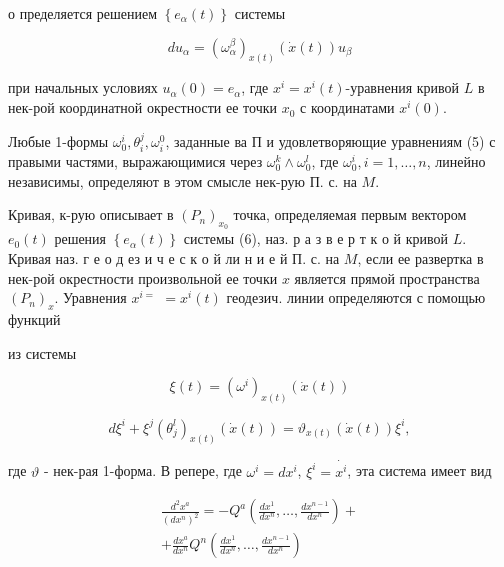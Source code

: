 \documentclass[10pt]{article}
\begin{document}
о пределяется решением $\left\{e_{\alpha}(t)\right\}$ системы



\[

d u_{\alpha}=\left(\omega_{\alpha}^{\beta}\right)_{x(t)}(\dot{x}(t)) u_{\beta}

\]



при начальных условиях $u_{\alpha}(0)=e_{\alpha}$, где $x^{i}=x^{i}(t)$-уравнения кривой $L$ в нек-рой координатной окрестности ее точки $x_{0}$ с координатами $x^{i}(0)$.



Любые 1-формы $\omega_{0}^{i}, \theta_{i}^{j}, \omega_{i}^{0}$, заданные ва П и удовлетворяющие уравнениям (5) с правыми частями, выражающимися через $\omega_{0}^{k} \wedge \omega_{0}^{l}$, где $\omega_{0}^{i}, i=1, \ldots, n$, линейно независимы, определяют в этом смысле нек-рую П. с. на $M$.



Кривая, к-рую описывает в $\left(P_{n}\right)_{x_{0}}$ точка, определяемая первым вектором $e_{0}(t)$ решения $\left\{e_{\alpha}(t)\right\}$ системы (6), наз. р а з в е р т к о й кривой $L$. Кривая наз. г е о д ез и ч е с к о й ли н и е й П. с. на $M$, если ее развертка в нек-рой окрестности произвольной ее точки $x$ является прямой пространства $\left(P_{n}\right)_{x}$. Уравнения $x^{i=}$ $=x^{i}(t)$ геодезич. линии определяются с помощью функций



из системы



\[

\xi(t)=\left(\omega^{i}\right)_{x(t)}(\dot{x}(t))

\]



\[

d \xi^{i}+\xi^{j}\left(\theta_{j}^{l}\right)_{x(t)}(\dot{x}(t))=\vartheta_{x(t)}(\dot{x}(t)) \xi^{i},

\]



где $\vartheta$ - нек-рая 1-форма. В репере, где $\omega^{i}=d x^{i}$, $\xi^{i}=\dot{x^{i}}$, эта система имеет вид



\[

\begin{gathered}

\frac{d^{2} x^{a}}{\left(d x^{n}\right)^{2}}=-Q^{a}\left(\frac{d x^{1}}{d x^{n}}, \ldots, \frac{d x^{n-1}}{d x^{n}}\right)+ \\

+\frac{d x^{a}}{d x^{n}} Q^{n}\left(\frac{d x^{1}}{d x^{n}}, \ldots, \frac{d x^{n-1}}{d x^{n}}\right)

\end{gathered}

\]
\end{document}
